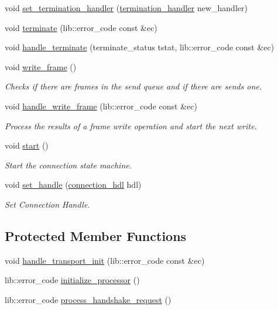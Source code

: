 \begin{DoxyCompactItemize}
void \hyperlink{classwebsocketpp_1_1connection_ac72ff8473d0a49bb069825e99e99ca9d}{set\+\_\+termination\+\_\+handler} (\hyperlink{classwebsocketpp_1_1connection_a8da9613d1f13c9f4571ffb0810d43e63}{termination\+\_\+handler} new\+\_\+handler)
\item 
void \hyperlink{classwebsocketpp_1_1connection_a7267aae677a77e5e9379ecb6db1789a3}{terminate} (lib\+::error\+\_\+code const \&ec)
\item 
void \hyperlink{classwebsocketpp_1_1connection_a5012a184129c08ea3f6cfa377e1770c1}{handle\+\_\+terminate} (terminate\+\_\+status tstat, lib\+::error\+\_\+code const \&ec)
\item 
void \hyperlink{classwebsocketpp_1_1connection_a8d26a29e90d4847f3882c280112c6b60}{write\+\_\+frame} ()
\begin{DoxyCompactList}\small\item\em Checks if there are frames in the send queue and if there are sends one. \end{DoxyCompactList}\item 
void \hyperlink{classwebsocketpp_1_1connection_a867f94b82788e978ea116d50cf83d72e}{handle\+\_\+write\+\_\+frame} (lib\+::error\+\_\+code const \&ec)
\begin{DoxyCompactList}\small\item\em Process the results of a frame write operation and start the next write. \end{DoxyCompactList}\item 
void \hyperlink{classwebsocketpp_1_1connection_a152530ff43396025175f85748d8ee708}{start} ()
\begin{DoxyCompactList}\small\item\em Start the connection state machine. \end{DoxyCompactList}\item 
void \hyperlink{classwebsocketpp_1_1connection_af07f4fac45e1b64de7e0d12ece0d23a8}{set\+\_\+handle} (\hyperlink{namespacewebsocketpp_a6b3d26a10ee7229b84b776786332631d}{connection\+\_\+hdl} hdl)
\begin{DoxyCompactList}\small\item\em Set Connection Handle. \end{DoxyCompactList}\end{DoxyCompactItemize}
\subsection*{Protected Member Functions}
\begin{DoxyCompactItemize}
\item 
void \hyperlink{classwebsocketpp_1_1connection_ad42c5982a35b82c9009971722943b1e0}{handle\+\_\+transport\+\_\+init} (lib\+::error\+\_\+code const \&ec)
\item 
lib\+::error\+\_\+code \hyperlink{classwebsocketpp_1_1connection_ac1c576bd4dfebac977eade9ac637a432}{initialize\+\_\+processor} ()
\item 
lib\+::error\+\_\+code \hyperlink{classwebsocketpp_1_1connection_a569483c7dcf542f500f6e9f49d803010}{process\+\_\+handshake\+\_\+request} ()
\end{DoxyCompactItemize}


